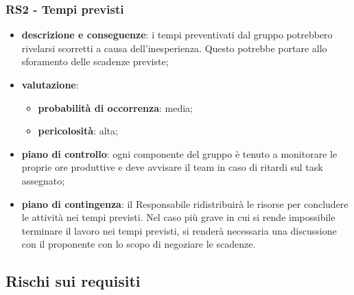     \subsubsection{RS2 - Tempi previsti} \label{sec:RS2}
        \begin{itemize}
            \item \textbf{descrizione e conseguenze}: i tempi preventivati dal gruppo potrebbero rivelarsi scorretti a causa dell'inesperienza. Questo potrebbe portare allo sforamento delle scadenze previste;
            \item \textbf{valutazione}:
            \begin{itemize} 
                \item \textbf{probabilità di occorrenza}: media;
                \item \textbf{pericolosità}: alta;
            \end{itemize}
            \item \textbf{piano di controllo}: ogni componente del gruppo è tenuto a monitorare le proprie ore produttive e deve avvisare il team in caso di ritardi sul task assegnato;
            \item \textbf{piano di contingenza}: il Responsabile ridistribuirà le risorse per concludere le attività nei tempi previsti. Nel caso più grave in cui si rende impossibile terminare il lavoro nei tempi previsti, si renderà necessaria una discussione con il proponente con lo scopo di negoziare le scadenze.
        \end{itemize}

\subsection{Rischi sui requisiti} %

